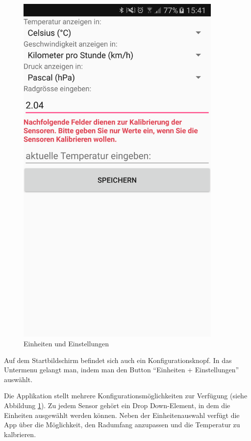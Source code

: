 \begin{figure}[ht]
\begin{minipage}[t]{0.5\textwidth}
    \includegraphics[width=0.9\textwidth]{4Resultate/imag/BLEEinheitenUndEinstellungenStart.png} 
    \caption{Einheiten und Einstellungen}
    \label{einheiten}
 \end{minipage}
\end{figure}

Auf dem Startbildschirm befindet sich auch ein Konfigurationsknopf. In das Untermenu gelangt man, indem man den Button ``Einheiten + Einstellungen'' auswählt.

Die Applikation stellt mehrere Konfigurationsmöglichkeiten zur Verfügung (siehe Abbildung \ref{einheiten}). Zu jedem Sensor gehört ein Drop Down-Element, in dem die Einheiten ausgewählt werden können. Neben der Einheitenauswahl verfügt die App über die Möglichkeit, den Radumfang anzupassen und die Temperatur zu kalbrieren. 

